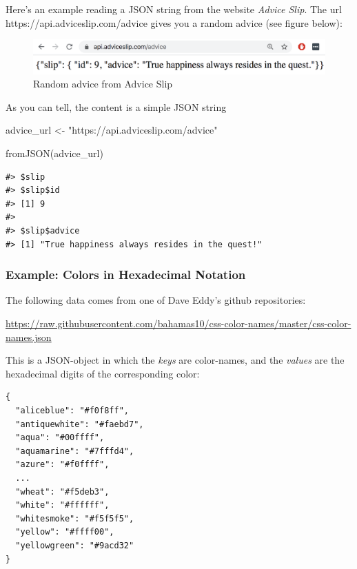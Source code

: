 \documentclass[
]{book}
\newenvironment{Shaded}{\begin{snugshade}}{\end{snugshade}}
\newcommand{\FunctionTok}[1]{\textcolor[rgb]{0.00,0.00,0.00}{#1}}
\newcommand{\NormalTok}[1]{#1}
\newcommand{\OtherTok}[1]{\textcolor[rgb]{0.56,0.35,0.01}{#1}}
\newcommand{\StringTok}[1]{\textcolor[rgb]{0.31,0.60,0.02}{#1}}
\begin{document}
Here's an example reading a JSON string from the website \emph{Advice Slip}.
The url https://api.adviceslip.com/advice
gives you a random advice (see figure below):

\begin{figure}

{\centering \includegraphics[width=0.8\linewidth]{images/api/advice-slip-happiness} 

}

\caption{Random advice from Advice Slip}\label{fig:unnamed-chunk-104}
\end{figure}

As you can tell, the content is a simple JSON string

\begin{Shaded}
\begin{Highlighting}[]
\NormalTok{advice\_url }\OtherTok{\textless{}{-}} \StringTok{"https://api.adviceslip.com/advice"}

\FunctionTok{fromJSON}\NormalTok{(advice\_url)}
\end{Highlighting}
\end{Shaded}

\begin{verbatim}
#> $slip
#> $slip$id
#> [1] 9
#> 
#> $slip$advice
#> [1] "True happiness always resides in the quest!"
\end{verbatim}

\hypertarget{example-colors-in-hexadecimal-notation}{%
\subsubsection*{Example: Colors in Hexadecimal Notation}\label{example-colors-in-hexadecimal-notation}}

The following data comes from one of Dave Eddy's github repositories:

\url{https://raw.githubusercontent.com/bahamas10/css-color-names/master/css-color-names.json}

This is a JSON-object in which the \emph{keys} are color-names, and the \emph{values} are
the hexadecimal digits of the corresponding color:

\begin{verbatim}
{
  "aliceblue": "#f0f8ff",
  "antiquewhite": "#faebd7",
  "aqua": "#00ffff",
  "aquamarine": "#7fffd4",
  "azure": "#f0ffff",
  ...
  "wheat": "#f5deb3",
  "white": "#ffffff",
  "whitesmoke": "#f5f5f5",
  "yellow": "#ffff00",
  "yellowgreen": "#9acd32"
}
\end{verbatim}
\end{document}
